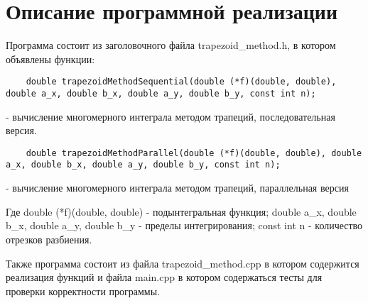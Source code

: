 \documentclass{report}
\begin{document}
\section*{Описание программной реализации}
	Программа состоит из заголовочного файла trapezoid\_method.h, в котором объявлены функции:
	\begin{lstlisting}
	double trapezoidMethodSequential(double (*f)(double, double), double a_x, double b_x, double a_y, double b_y, const int n);\end{lstlisting}\par- вычисление многомерного интеграла методом трапеций, последовательная версия.
    \begin{lstlisting}
	double trapezoidMethodParallel(double (*f)(double, double), double a_x, double b_x, double a_y, double b_y, const int n);\end{lstlisting}\par- вычисление многомерного интеграла методом трапеций, параллельная версия 
	\par Где double (*f)(double, double) - подынтегральная функция;  double a\_x, double b\_x, double a\_y, double b\_y - пределы интегрирования; const int n - количество отрезков разбиения.
	\par Также программа состоит из файла trapezoid\_method.cpp в котором содержится реализация функций и файла main.cpp в котором содержаться тесты для проверки корректности программы.
\newpage

\end{document}
